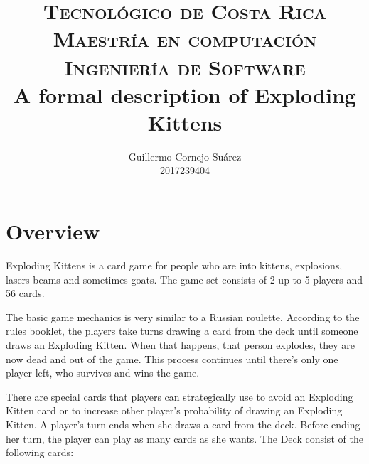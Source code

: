 \documentclass[11pt, fuzz]{article}
\title{		
		\usefont{OT1}{bch}{b}{n}
        \Large \textsc{Tecnológico de Costa Rica} \\
		\normalsize \textsc{Maestría en computación} \\ 
		\normalsize \textsc{Ingeniería de Software} \\ [25pt]		
		\Huge A formal description of Exploding Kittens \\	
}
\author{
		\normalfont \Large   Guillermo Cornejo Suárez \\ 		
        \large		 		 2017239404 \\ 		        
}
\begin{document}
\maketitle

\section{Overview}

Exploding Kittens is a card game for people who are into kittens, explosions, lasers beams and sometimes goats. The game set consists of 2 up to 5 players and 56 cards. 

The basic game mechanics is very similar to a Russian roulette. According to the rules booklet, the players take turns drawing a card from the deck until someone draws an Exploding Kitten. When that happens, that person explodes, they are now dead and out of the game. This process continues until there's only one player left, who survives and wins the game. 

There are special cards that players can strategically use to avoid an Exploding Kitten card or to increase other player's probability of drawing an Exploding Kitten. A player's turn ends when she draws a card from the deck. Before ending her turn, the player can play as many cards as she wants. The Deck consist of the following cards: 
\end{document}
